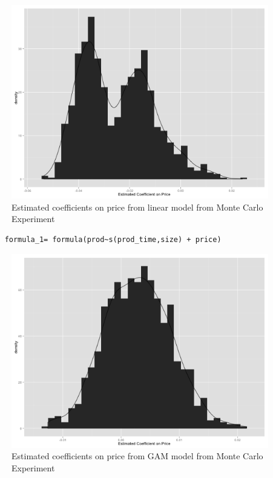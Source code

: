 \documentclass{beamer}
\begin{document}
\begin{frame}[plain]
	\begin{figure}
		\includegraphics[width=1\textwidth]{figures/lin_model_price_mc.png}
		\caption{Estimated coefficients on price from linear model from Monte Carlo Experiment}
		\label{lin_model_price_mc}	
	\end{figure}
\end{frame}

\begin{frame}
	\begin{verbatim}
	formula_1= formula(prod~s(prod_time,size) + price)
	\end{verbatim}
\end{frame}


\begin{frame}[plain]
	\begin{figure}
		\includegraphics[width=1\textwidth]{figures/gam_model_price_mc.png}
		\caption{Estimated coefficients on price from GAM model from Monte Carlo Experiment}
		\label{gam_model_price_mc.png}	
	\end{figure}
\end{frame}
\end{document}

